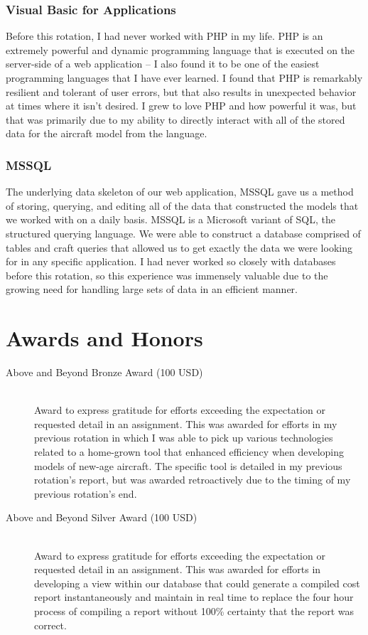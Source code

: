 \documentclass{article}
\begin{document}
\subsubsection{Visual Basic for Applications}
Before this rotation, I had never worked with PHP in my life. PHP is an extremely powerful and dynamic programming language that is executed on the server-side of a web application -- I also found it to be one of the easiest programming languages that I have ever learned. I found that PHP is remarkably resilient and tolerant of user errors, but that also results in unexpected behavior at times where it isn't desired. I grew to love PHP and how powerful it was, but that was primarily due to my ability to directly interact with all of the stored data for the aircraft model from the language.
\subsubsection{MSSQL}
The underlying data skeleton of our web application, MSSQL gave us a method of storing, querying, and editing all of the data that constructed the models that we worked with on a daily basis. MSSQL is a Microsoft variant of SQL, the structured querying language. We were able to construct a database comprised of tables and craft queries that allowed us to get exactly the data we were looking for in any specific application. I had never worked so closely with databases before this rotation, so this experience was immensely valuable due to the growing need for handling large sets of data in an efficient manner.

\section{Awards and Honors}
\begin{description}
  \item[Above and Beyond Bronze Award (100 USD)] \hfill \\
    Award to express gratitude for efforts exceeding the expectation or requested detail in an assignment. This was awarded for efforts in my previous rotation in which I was able to pick up various technologies related to a home-grown tool that enhanced efficiency when developing models of new-age aircraft. The specific tool is detailed in my previous rotation's report, but was awarded retroactively due to the timing of my previous rotation's end.
  \item[Above and Beyond Silver Award (100 USD)] \hfill \\
    Award to express gratitude for efforts exceeding the expectation or requested detail in an assignment. This was awarded for efforts in developing a view within our database that could generate a compiled cost report instantaneously and maintain in real time to replace the four hour process of compiling a report without 100\% certainty that the report was correct.
\end{description}
\end{document}
